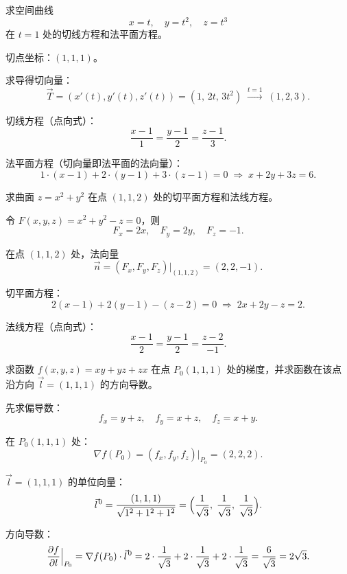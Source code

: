 \documentclass[answer]{THUExam}
\begin{document}

\begin{problem}
求空间曲线
\[
x=t,\quad y=t^2,\quad z=t^3
\]
在 $t=1$ 处的切线方程和法平面方程。
\end{problem}

\begin{solution}
切点坐标：$(1,1,1)$。

求导得切向量：
\[
\vec{T}=(x'(t),y'(t),z'(t))=(1,\,2t,\,3t^2)\;\xrightarrow{t=1}\;(1,2,3).
\]

切线方程（点向式）：
\[
\frac{x-1}{1}=\frac{y-1}{2}=\frac{z-1}{3}.
\]

法平面方程（切向量即法平面的法向量）：
\[
1\cdot(x-1)+2\cdot(y-1)+3\cdot(z-1)=0
\;\Longrightarrow\; x+2y+3z=6.
\]
\end{solution}
\bigskip

\begin{problem}
求曲面 $z=x^2+y^2$ 在点 $(1,1,2)$ 处的切平面方程和法线方程。
\end{problem}

\begin{solution}
令 $F(x,y,z)=x^2+y^2-z=0$，则
\[
F_x=2x,\quad F_y=2y,\quad F_z=-1.
\]

在点 $(1,1,2)$ 处，法向量
\[
\vec{n}=(F_x,F_y,F_z)\big|_{(1,1,2)}=(2,2,-1).
\]

切平面方程：
\[
2(x-1)+2(y-1)-(z-2)=0 \;\Longrightarrow\; 2x+2y-z=2.
\]

法线方程（点向式）：
\[
\frac{x-1}{2}=\frac{y-1}{2}=\frac{z-2}{-1}.
\]
\end{solution}
\bigskip

\begin{problem}
求函数 $f(x,y,z)=xy+yz+zx$ 在点 $P_0(1,1,1)$ 处的梯度，并求函数在该点沿方向 $\vec{l}=(1,1,1)$ 的方向导数。
\end{problem}

\begin{solution}
先求偏导数：
\[
f_x=y+z,\quad f_y=x+z,\quad f_z=x+y.
\]

在 $P_0(1,1,1)$ 处：
\[
\nabla f(P_0)=(f_x,f_y,f_z)\big|_{P_0}=(2,2,2).
\]

$\vec{l}=(1,1,1)$ 的单位向量：
\[
\vec{l}^{\kern1pt0}=\frac{(1,1,1)}{\sqrt{1^2+1^2+1^2}}
=\Bigl(\frac{1}{\sqrt{3}},\;\frac{1}{\sqrt{3}},\;\frac{1}{\sqrt{3}}\Bigr).
\]

方向导数：
\[
\frac{\partial f}{\partial l}\Big|_{P_0}
=\nabla f(P_0)\cdot\vec{l}^{\kern1pt0}
=2\cdot\frac{1}{\sqrt{3}}+2\cdot\frac{1}{\sqrt{3}}+2\cdot\frac{1}{\sqrt{3}}
=\frac{6}{\sqrt{3}}=2\sqrt{3}.
\]
\end{solution}
\bigskip
\end{document}
